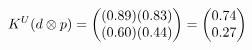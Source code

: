 \documentclass[preview]{standalone}
\begin{document}
\begin{align*}
\special{dvisvgm:raw <g id='unique000'>}K^U(d \otimes p) = \begin{pmatrix} (0.89)(0.83) \\ (0.60)(0.44) \end{pmatrix} = \begin{pmatrix} 0.74 \\ 0.27 \end{pmatrix}\special{dvisvgm:raw </g>}
\end{align*}
\end{document}
